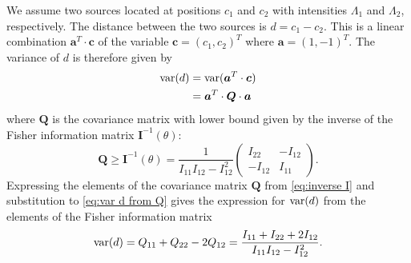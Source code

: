 We assume two sources located at positions $c_1$ and $c_2$ with intensities $\Lambda_1$ and $\Lambda_2$, respectively. The distance between the two sources is $d=c_1-c_2$. This is a linear combination $\bm{a}^{T}\cdot\bm{c}$ of the variable $\bm{c}=(c_1,c_2)^{T}$ where $\bm{a}=(1,-1)^{T}$. The variance of $d$ is therefore given by 
%
\begin{alignat}{1}
	\mathrm{var}(d)
	&=\mathrm{var}(\bm{a}^{T}\cdot\bm{c})\nonumber\\
	&=\bm{a}^{T}\cdot\bm{Q}\cdot\bm{a}
	\label{eq:var d from Q}
\end{alignat}
%
where $\bm{Q}$ is the covariance matrix with lower bound given by the inverse of the Fisher information matrix $\bm{I}^{-1}(\theta)$: 
%
\begin{equation}
	\bm{Q}\geq\bm{I}^{-1}(\theta)=\frac{1}{I_{11}I_{12}-I_{12}^2}\left(
	\begin{array}{cc}
		I_{22} & -I_{12}\\
		-I_{12} & I_{11}
	\end{array}\right).
	\label{eq:inverse I}
\end{equation}
%
Expressing the elements of the covariance matrix $\bm{Q}$ from \autoref{eq:inverse I} and substitution to \autoref{eq:var d from Q} gives the expression for $\mathrm{var}(d)$ from the elements of the Fisher information matrix
%
\begin{equation}
	\mathrm{var}(d)=Q_{11}+Q_{22}-2Q_{12}=\frac{I_{11}+I_{22}+2I_{12}}{I_{11}I_{12}-I_{12}^2}.
	\label{eq:variance d alternative}
\end{equation}

